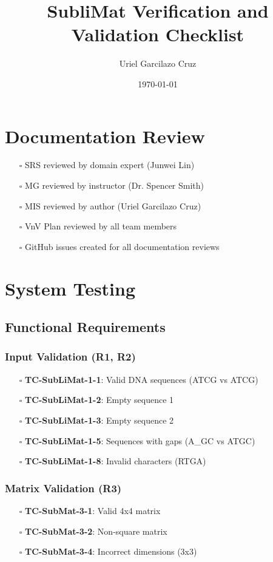 \documentclass{article}
\title{SubliMat Verification and Validation Checklist}
\author{Uriel Garcilazo Cruz}
\date{\today}
\begin{document}
\maketitle

\section*{Documentation Review}
\begin{itemize}[leftmargin=*]
    \item[$\square$] SRS reviewed by domain expert (Junwei Lin)
    \item[$\square$] MG reviewed by instructor (Dr. Spencer Smith)
    \item[$\square$] MIS reviewed by author (Uriel Garcilazo Cruz)
    \item[$\square$] VnV Plan reviewed by all team members
    \item[$\square$] GitHub issues created for all documentation reviews
\end{itemize}

\section*{System Testing}
\subsection*{Functional Requirements}
\subsubsection*{Input Validation (R1, R2)}
\begin{itemize}[leftmargin=*]
    \item[$\square$] \textbf{TC-SubLiMat-1-1}: Valid DNA sequences (ATCG vs ATCG)
    \item[$\square$] \textbf{TC-SubLiMat-1-2}: Empty sequence 1
    \item[$\square$] \textbf{TC-SubLiMat-1-3}: Empty sequence 2  
    \item[$\square$] \textbf{TC-SubLiMat-1-5}: Sequences with gaps (A\_GC vs ATGC)
    \item[$\square$] \textbf{TC-SubLiMat-1-8}: Invalid characters (RTGA)
\end{itemize}

\subsubsection*{Matrix Validation (R3)}
\begin{itemize}[leftmargin=*]
    \item[$\square$] \textbf{TC-SubMat-3-1}: Valid 4x4 matrix
    \item[$\square$] \textbf{TC-SubMat-3-2}: Non-square matrix
    \item[$\square$] \textbf{TC-SubMat-3-4}: Incorrect dimensions (3x3)
\end{itemize}
\end{document}
